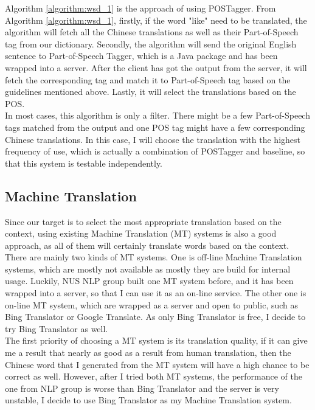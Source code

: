\begin{CJK}{UTF8}{gbsn}
Algorithm \ref{algorithm:wsd_1} is the approach of using POSTagger. From Algorithm  \ref{algorithm:wsd_1}, firstly, if the word "like" need to be translated, the algorithm will fetch all the Chinese translations as well as their Part-of-Speech tag from our dictionary. Secondly, the algorithm will send the original English sentence to Part-of-Speech Tagger, which is a Java package and has been wrapped into a server. After the client has got the output from the server, it will fetch the corresponding tag and match it to Part-of-Speech tag based on the guidelines mentioned above. Lastly, it will select the translations based on the POS.
\\
In most cases, this algorithm is only a filter. There might be a few Part-of-Speech tags matched from the output and one POS tag might have a few corresponding Chinese translations. In this case, I will choose the translation with the highest frequency of use, which is actually a combination of POSTagger and baseline, so that this system is testable independently.


\subsection{Machine Translation}
Since our target is to select the most appropriate translation based on the context, using existing Machine Translation (MT) systems is also a good approach, as all of them will certainly translate words based on the context.
\\
There are mainly two kinds of MT systems. One is off-line Machine Translation systems, which are mostly not available as mostly they are build for internal usage. Luckily, NUS NLP group built one MT system before, and it has been wrapped into a server, so that I can use it as an on-line service. The other one is on-line MT system, which are wrapped as a server and open to public, such as Bing Translator or Google Translate. As only Bing Translator is free, I decide to try Bing Translator as well.
\\
The first priority of choosing a MT system is its translation quality, if it can give me a result that nearly as good as a result from human translation, then the Chinese word that I generated from the MT system will have a high chance to be correct as well. However, after I tried both MT systems, the performance of the one from NLP group is worse than Bing Translator and the server is very unstable, I decide to use Bing Translator as my Machine Translation system.
\\



\end{CJK}
